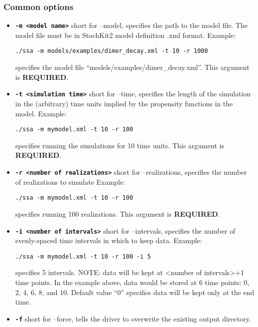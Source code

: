 \documentclass[11pt,letterpaper]{article}
\begin{document}
\subsubsection{Common options}
\begin{itemize}
    \item \texttt{\textbf{-m <model name>}} short for --model, specifies the path to the model file.  The model file must be in StochKit2 model definition .xml format.
Example: 
\begin{lstlisting}
./ssa -m models/examples/dimer_decay.xml -t 10 -r 1000
\end{lstlisting}
specifies the model file ``models/examples/dimer\_decay.xml''.
This argument is \textbf{REQUIRED}.
\item \texttt{\textbf{-t <simulation time>}} short for --time, specifies the length of the simulation in the (arbitrary) time units implied by the propensity functions in the model.
Example:
\begin{lstlisting}
./ssa -m mymodel.xml -t 10 -r 100
\end{lstlisting}
specifies running the simulations for 10 time units.
This argument is \textbf{REQUIRED}.
\item \texttt{\textbf{-r <number of realizations>}} short for --realizations, specifies the number of realizations to simulate
Example:
\begin{lstlisting}
./ssa -m mymodel.xml -t 10 -r 100
\end{lstlisting}
specifies running 100 realizations.
This argument is \textbf{REQUIRED}.
\item \texttt{\textbf{-i <number of intervals>}} short for --intervals, specifies the number of evenly-spaced time intervals in which to keep data.
Example: 
\begin{lstlisting}
./ssa -m mymodel.xml -t 10 -r 100 -i 5
\end{lstlisting}
specifies 5 intervals.
NOTE: data will be kept at <number of intervals>+1 time points.  In the example above, data would be stored at 6 time points: 0, 2, 4, 6, 8, and 10.
Default value “0” specifies data will be kept only at the end time.
\item \texttt{\textbf{-f}} short for --force, tells the driver to overwrite the existing output directory.


\end{itemize}
\end{document}
